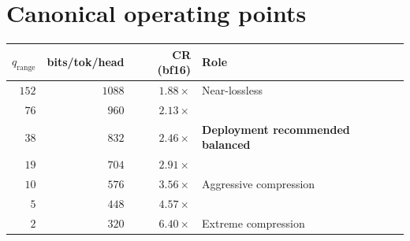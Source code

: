 \documentclass[11pt,a4paper]{article}
\theoremstyle{definition}
\theoremstyle{plain}
\begin{document}
\section{Canonical operating points}
\label{app:ops}

\begin{tabular}{rrrl}
  \toprule
  $q_\mathrm{range}$ & bits/tok/head & CR (bf16) & Role \\
  \midrule
  $152$ & $1088$ & $1.88\times$ & Near-lossless \\
  $\phantom{0}76$ & $\phantom{0}960$ & $2.13\times$ & \\
  $\phantom{0}38$ & $\phantom{0}832$ & $2.46\times$ & \textbf{Deployment recommended balanced} \\
  $\phantom{0}19$ & $\phantom{0}704$ & $2.91\times$ & \\
  $\phantom{0}10$ & $\phantom{0}576$ & $3.56\times$ & Aggressive compression \\
  $\phantom{00}5$ & $\phantom{0}448$ & $4.57\times$ & \\
  $\phantom{00}2$ & $\phantom{0}320$ & $6.40\times$ & Extreme compression \\
  \bottomrule
\end{tabular}
\end{document}
